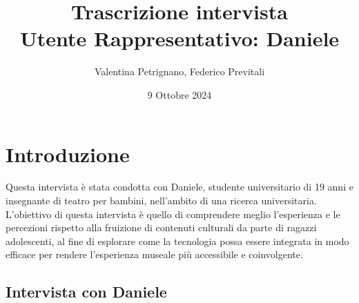 \documentclass{article}
\title{\textbf{Trascrizione intervista}\\ Utente Rappresentativo: Daniele}
\author{Valentina Petrignano, Federico Previtali }
\date{9 Ottobre 2024}
\begin{document}
\maketitle

\section{Introduzione}
Questa intervista è stata condotta con Daniele, studente universitario di 19 anni e insegnante di teatro per bambini, nell'ambito di una ricerca universitaria. 
L’obiettivo di questa intervista è quello di comprendere meglio l'esperienza e le percezioni rispetto alla fruizione di contenuti culturali da parte di ragazzi adolescenti, al fine di esplorare come la tecnologia possa essere integrata in modo efficace per rendere l’esperienza museale più accessibile e coinvolgente.

\subsection{\textcolor{subsectioncolor}{Intervista con Daniele}}
\end{document}
